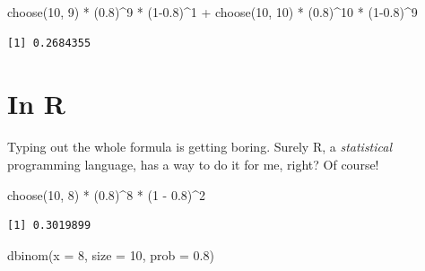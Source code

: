\documentclass[
  letterpaper,
  DIV=11,
  numbers=noendperiod]{scrreprt}
\newenvironment{Shaded}{\begin{snugshade}}{\end{snugshade}}
\newcommand{\AttributeTok}[1]{\textcolor[rgb]{0.40,0.45,0.13}{#1}}
\newcommand{\DecValTok}[1]{\textcolor[rgb]{0.68,0.00,0.00}{#1}}
\newcommand{\FloatTok}[1]{\textcolor[rgb]{0.68,0.00,0.00}{#1}}
\newcommand{\FunctionTok}[1]{\textcolor[rgb]{0.28,0.35,0.67}{#1}}
\newcommand{\NormalTok}[1]{\textcolor[rgb]{0.00,0.23,0.31}{#1}}
\newcommand{\SpecialCharTok}[1]{\textcolor[rgb]{0.37,0.37,0.37}{#1}}
\begin{document}
\begin{Shaded}
\begin{Highlighting}[]
\FunctionTok{choose}\NormalTok{(}\DecValTok{10}\NormalTok{, }\DecValTok{9}\NormalTok{) }\SpecialCharTok{*}\NormalTok{ (}\FloatTok{0.8}\NormalTok{)}\SpecialCharTok{\^{}}\DecValTok{9} \SpecialCharTok{*}\NormalTok{ (}\DecValTok{1}\FloatTok{{-}0.8}\NormalTok{)}\SpecialCharTok{\^{}}\DecValTok{1} \SpecialCharTok{+}
  \FunctionTok{choose}\NormalTok{(}\DecValTok{10}\NormalTok{, }\DecValTok{10}\NormalTok{) }\SpecialCharTok{*}\NormalTok{ (}\FloatTok{0.8}\NormalTok{)}\SpecialCharTok{\^{}}\DecValTok{10} \SpecialCharTok{*}\NormalTok{ (}\DecValTok{1}\FloatTok{{-}0.8}\NormalTok{)}\SpecialCharTok{\^{}}\DecValTok{9}
\end{Highlighting}
\end{Shaded}

\begin{verbatim}
[1] 0.2684355
\end{verbatim}

\hypertarget{in-r}{%
\section{In R}\label{in-r}}

Typing out the whole formula is getting boring. Surely R, a
\emph{statistical} programming language, has a way to do it for me,
right? Of course!

\begin{Shaded}
\begin{Highlighting}[]
\FunctionTok{choose}\NormalTok{(}\DecValTok{10}\NormalTok{, }\DecValTok{8}\NormalTok{) }\SpecialCharTok{*}\NormalTok{ (}\FloatTok{0.8}\NormalTok{)}\SpecialCharTok{\^{}}\DecValTok{8} \SpecialCharTok{*}\NormalTok{ (}\DecValTok{1} \SpecialCharTok{{-}} \FloatTok{0.8}\NormalTok{)}\SpecialCharTok{\^{}}\DecValTok{2}
\end{Highlighting}
\end{Shaded}

\begin{verbatim}
[1] 0.3019899
\end{verbatim}

\begin{Shaded}
\begin{Highlighting}[]
\FunctionTok{dbinom}\NormalTok{(}\AttributeTok{x =} \DecValTok{8}\NormalTok{, }\AttributeTok{size =} \DecValTok{10}\NormalTok{, }\AttributeTok{prob =} \FloatTok{0.8}\NormalTok{)}
\end{Highlighting}
\end{Shaded}
\end{document}
